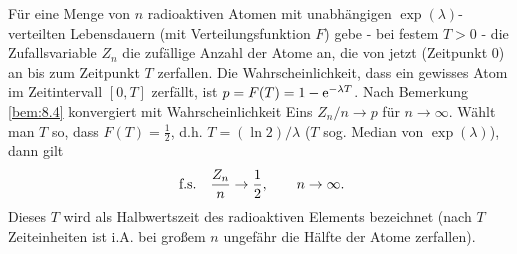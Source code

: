 \begin{bsp}
Für eine Menge von $n$ radioaktiven Atomen mit unabhängigen
$\exp(\lambda)$-verteilten Lebensdauern (mit Verteilungsfunktion $F$) gebe -
bei festem $T>0$ - die Zufallsvariable $Z_n$ die zufällige Anzahl der Atome an,
die von jetzt (Zeitpunkt $0$) an bis zum Zeitpunkt $T$ zerfallen. Die
Wahrscheinlichkeit, dass ein gewisses Atom im Zeitintervall $[0,T]$ zerfällt,
ist $p=F(T) = 1-\mathrm{e}^{-\lambda T}$. Nach Bemerkung \ref{bem:8.4} konvergiert mit
Wahrscheinlichkeit Eins $Z_n/n\to p$ für $n\to\infty$. Wählt man $T$ so, dass
$F(T) = \frac{1}{2}$, d.h. $T=(\ln 2) / \lambda$ ($T$ sog. Median von
$\exp(\lambda)$), dann gilt
\begin{align*}
\ \text{f.s.}\quad \frac{Z_n}{n}\to \frac{1}{2},\qquad n\to\infty.
\end{align*}
Dieses $T$ wird als Halbwertszeit des radioaktiven Elements bezeichnet (nach
$T$ Zeiteinheiten ist i.A. bei großem $n$ ungefähr die Hälfte der Atome
zerfallen).\bsphere
\end{bsp}

